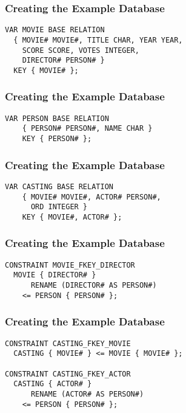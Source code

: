 \documentclass[dvipsnames]{beamer}
\theoremstyle{plain}
\begin{document}
\begin{frame}[fragile]
  \frametitle{Creating the Example Database}

  \begin{example}
    \begin{lstlisting}
VAR MOVIE BASE RELATION
  { MOVIE# MOVIE#, TITLE CHAR, YEAR YEAR,
    SCORE SCORE, VOTES INTEGER,
    DIRECTOR# PERSON# }
  KEY { MOVIE# };
    \end{lstlisting}
  \end{example}
\end{frame}

\begin{frame}[fragile]
  \frametitle{Creating the Example Database}

  \begin{example}
    \begin{lstlisting}
VAR PERSON BASE RELATION
    { PERSON# PERSON#, NAME CHAR }
    KEY { PERSON# };
    \end{lstlisting}
  \end{example}
\end{frame}

\begin{frame}[fragile]
  \frametitle{Creating the Example Database}

  \begin{example}
    \begin{lstlisting}
VAR CASTING BASE RELATION
    { MOVIE# MOVIE#, ACTOR# PERSON#,
      ORD INTEGER }
    KEY { MOVIE#, ACTOR# };
    \end{lstlisting}
  \end{example}
\end{frame}

\begin{frame}[fragile]
  \frametitle{Creating the Example Database}

  \begin{example}
    \begin{lstlisting}
CONSTRAINT MOVIE_FKEY_DIRECTOR
  MOVIE { DIRECTOR# }
      RENAME (DIRECTOR# AS PERSON#)
    <= PERSON { PERSON# };
    \end{lstlisting}
  \end{example}
\end{frame}

\begin{frame}[fragile]
  \frametitle{Creating the Example Database}

  \begin{example}
    \begin{lstlisting}
CONSTRAINT CASTING_FKEY_MOVIE
  CASTING { MOVIE# } <= MOVIE { MOVIE# };

CONSTRAINT CASTING_FKEY_ACTOR
  CASTING { ACTOR# }
      RENAME (ACTOR# AS PERSON#)
    <= PERSON { PERSON# };
    \end{lstlisting}
  \end{example}
\end{frame}
\end{document}
